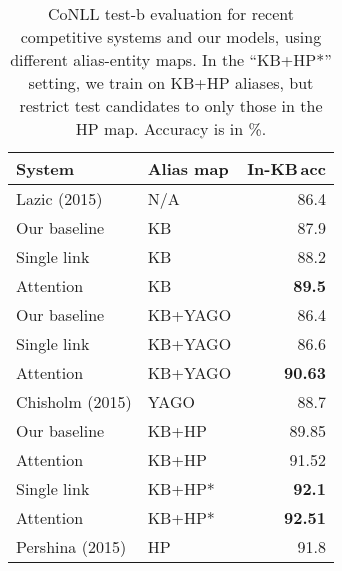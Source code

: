 


\begin{table}[ht!]
  \centering
  \begin{tabular}{l|l|r}
    System                 &  Alias map  & In-KB\,acc  \\
    \hline
    Lazic (2015)    & N/A          & 86.4 \\
    \hline
    Our baseline    & KB           & 87.9  \\
    Single link     & KB           & 88.2 \\
    Attention       & KB           & \todo{?}\textbf{89.5} \\
    \hline
    Our baseline    & KB+YAGO      & 86.4 \\
    Single link     & KB+YAGO      & 86.6 \\
    Attention       & KB+YAGO      & \todo{?}\textbf{90.63} \\
    Chisholm (2015) & YAGO         & 88.7 \\ 
    \hline
    Our baseline    & KB+HP        & 89.85 \\
    Attention       & KB+HP        & 91.52 \\
    Single link     & KB+HP*       & \todo{?}\textbf{92.1} \\
    Attention       & KB+HP*       & \todo{?}\textbf{92.51} \\
    Pershina (2015) & HP           & 91.8
  \end{tabular}
\caption{CoNLL test-b evaluation for recent competitive systems and
  our models, using different alias-entity maps.  In the ``KB+HP*''
  setting, we train on KB+HP aliases, but restrict test candidates to
  only those in the HP map.  Accuracy is in \%.}
 \label{table:conll_results} 
\end{table}



